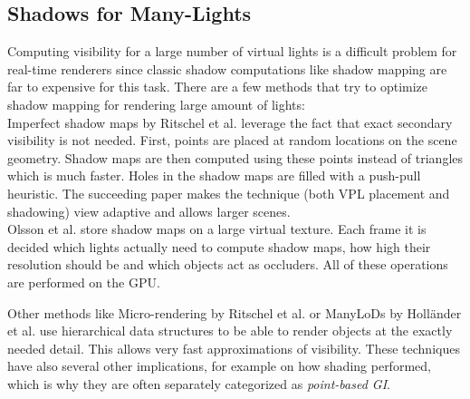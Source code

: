 \documentclass[thesis.tex]{subfiles}
\begin{document}
\subsection{Shadows for Many-Lights}
Computing visibility for a large number of virtual lights is a difficult problem for real-time renderers since classic shadow computations like shadow mapping are far to expensive for this task.
There are a few methods that try to optimize shadow mapping for rendering large amount of lights:
\\
Imperfect shadow maps by Ritschel et al. \cite{bib:imperfectshadowmaps} leverage the fact that exact secondary visibility is not needed.
First, points are placed at random locations on the scene geometry.
Shadow maps are then computed using these points instead of triangles which is much faster.
Holes in the shadow maps are filled with a push-pull heuristic.
The succeeding paper \cite{bib:imperfectshadowmaps:adapative} makes the technique (both VPL placement and shadowing) view adaptive and allows larger scenes.
\\
Olsson et al. \cite{bib:virtualshadowmaps} store shadow maps on a large virtual texture.
Each frame it is decided which lights actually need to compute shadow maps, how high their resolution should be and which objects act as occluders.
All of these operations are performed on the GPU.

Other methods like Micro-rendering by Ritschel et al. \cite{bib:microrendering} or ManyLoDs by Holländer et al. \cite{bib:manylods} use hierarchical data structures to be able to render objects at the exactly needed detail.
This allows very fast approximations of visibility.
These techniques have also several other implications, for example on how shading performed, which is why they are often separately categorized as \emph{point-based GI}.

%
%
\end{document}
